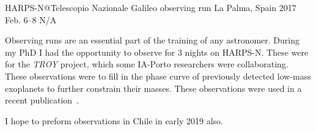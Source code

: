 {HARPS-N@Telescopio Nazionale Galileo observing run}
{La Palma, Spain}%
{2017 Feb. 6--8}%
{N/A}%
{}%
{Observing runs are an essential part of the training of any astronomer.
    During my PhD I had the opportunity to observe for 3 nights on HARPS-N. These were for the \emph{TROY} project, which some IA-Porto researchers were collaborating.  These observations were to fill in the phase curve of previously detected low-mass exoplanets to further constrain their masses. These observations were used in a recent publication~\citet{lillo-box_troy_2018}.

    {\red{} I hope to preform observations in Chile in early 2019 also.}
}%
